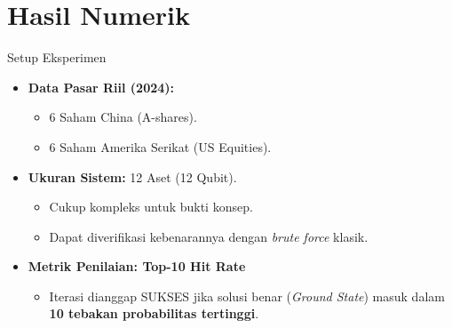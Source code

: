 \documentclass[10pt]{beamer}
\begin{document}
\section{Hasil Numerik}
\begin{frame}{Setup Eksperimen}
    \begin{itemize}
        \item \textbf{Data Pasar Riil (2024):}
        \begin{itemize}
            \item 6 Saham China (A-shares).
            \item 6 Saham Amerika Serikat (US Equities).
        \end{itemize}
        \item \textbf{Ukuran Sistem:} 12 Aset (12 Qubit).
        \begin{itemize}
            \item Cukup kompleks untuk bukti konsep.
            \item Dapat diverifikasi kebenarannya dengan \textit{brute force} klasik.
        \end{itemize}
        \item \textbf{Metrik Penilaian: Top-10 Hit Rate}
        \begin{itemize}
            \item Iterasi dianggap SUKSES jika solusi benar (\textit{Ground State}) masuk dalam \textbf{10 tebakan probabilitas tertinggi}.
        \end{itemize}
    \end{itemize}
\end{frame}
\end{document}
